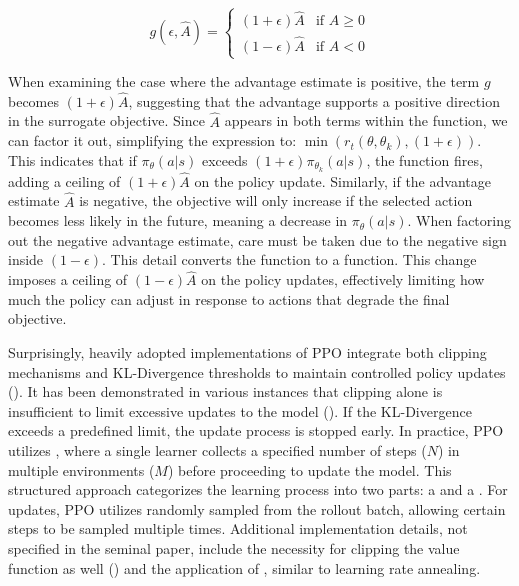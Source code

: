             \begin{equation}
                g(\epsilon, \hat{A}) = 
                    \begin{cases} 
                    (1 + \epsilon)\hat{A} & \text{if } \hat{A} \geq 0 \\
                    (1 - \epsilon)\hat{A} & \text{if } \hat{A} < 0 
                    \end{cases}
                \label{eq:PPO-gfunction}
            \end{equation}
            
            \noindent When examining the case where the advantage estimate is positive, the term $g$ becomes $(1+\epsilon)\hat{A}$, suggesting that the advantage supports a positive direction in the surrogate objective. Since $\hat{A}$ appears in both terms within the  function, we can factor it out, simplifying the expression to: $\min(r_t(\theta, \theta_k), (1+\epsilon))$. This indicates that if $\pi_{\theta}(a|s)$ exceeds $(1+\epsilon)\pi_{\theta_k}(a|s)$, the  function fires, adding a ceiling of $(1+\epsilon)\hat{A}$ on the policy update. Similarly, if the advantage estimate $\hat{A}$ is negative, the objective will only increase if the selected action becomes less likely in the future, meaning a decrease in $\pi_{\theta}(a|s)$. When factoring out the negative advantage estimate, care must be taken due to the negative sign inside $(1-\epsilon)$. This detail converts the  function to a  function. This change imposes a ceiling of \( (1-\epsilon)\hat{A} \) on the policy updates, effectively limiting how much the policy can adjust in response to actions that degrade the final objective.
            
            \bigskip
            
            \noindent Surprisingly, heavily adopted implementations of PPO integrate both clipping mechanisms and KL-Divergence thresholds to maintain controlled policy updates (\textcolor{deepblue}{\cite{shengyi2022the37implementation}}). It has been demonstrated in various instances that clipping alone is insufficient to limit excessive updates to the model (\textcolor{deepblue}{\cite{stable-baselines-issue213}}). If the KL-Divergence exceeds a predefined limit, the update process is stopped early. In practice, PPO utilizes , where a single learner collects a specified number of steps ($N$) in multiple environments ($M$) before proceeding to update the model. This structured approach categorizes the learning process into two parts: a  and a . For updates, PPO utilizes  randomly sampled from the rollout batch, allowing certain steps to be sampled multiple times. Additional implementation details, not specified in the seminal paper, include the necessity for clipping the value function as well (\textcolor{deepblue}{\cite{Engstrom2020Implementation}}) and the application of , similar to learning rate annealing. 
            

